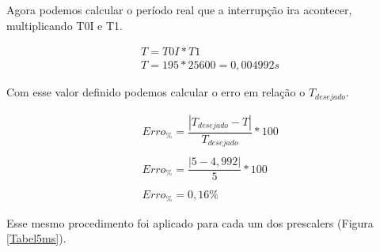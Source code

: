 \documentclass{article}
\begin{document}
Agora podemos calcular o período real que a interrupção ira acontecer, multiplicando T0I e T1.

\begin{align*}
   &T = T0I * T1\\
   &T = 195 * 25600 = 0,004992s
\end{align*}

Com esse valor definido podemos calcular o erro em relação o $T_{desejado}$.

\begin{align*}
   &Erro_\%= \dfrac{|T_{desejado}-T|}{T_{desejado}} * 100\\\\
   &Erro_\%= \dfrac{|5-4,992|}{5}*100\\\\
   &Erro_\%= 0,16\%
\end{align*}

Esse mesmo procedimento foi aplicado para cada um dos prescalers (Figura \ref{Tabel5ms}).

\end{document}
